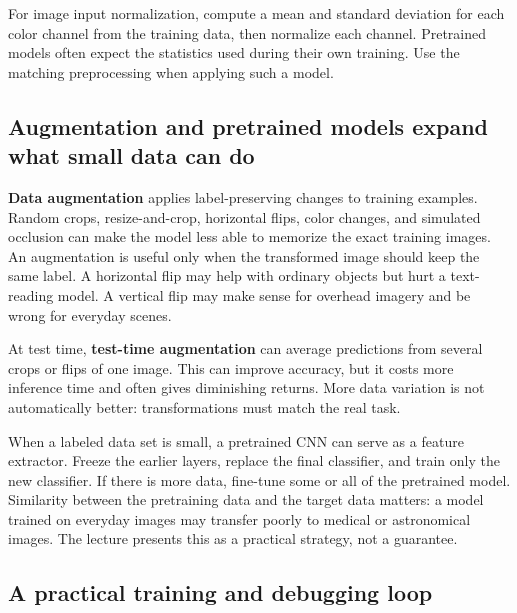 For image input normalization, compute a mean and standard deviation for each color channel from the training data, then normalize each channel. Pretrained models often expect the statistics used during their own training. Use the matching preprocessing when applying such a model.

\subsection{Augmentation and pretrained models expand what small data can do}\label{04-visual-computing-ii-ch031-augmentation-and-pretrained-models-expand-what-small-data-can-do}

\hypertarget{04-visual-computing-ii-ch031-augmentation-and-pretrained-models-expand-what-small-data-can-do}{}

\textbf{Data augmentation} applies label-preserving changes to training examples. Random crops, resize-and-crop, horizontal flips, color changes, and simulated occlusion can make the model less able to memorize the exact training images. An augmentation is useful only when the transformed image should keep the same label. A horizontal flip may help with ordinary objects but hurt a text-reading model. A vertical flip may make sense for overhead imagery and be wrong for everyday scenes.

At test time, \textbf{test-time augmentation} can average predictions from several crops or flips of one image. This can improve accuracy, but it costs more inference time and often gives diminishing returns. More data variation is not automatically better: transformations must match the real task.

When a labeled data set is small, a pretrained CNN can serve as a feature extractor. Freeze the earlier layers, replace the final classifier, and train only the new classifier. If there is more data, fine-tune some or all of the pretrained model. Similarity between the pretraining data and the target data matters: a model trained on everyday images may transfer poorly to medical or astronomical images. The lecture presents this as a practical strategy, not a guarantee.

\subsection{A practical training and debugging loop}\label{04-visual-computing-ii-ch031-a-practical-training-and-debugging-loop}

\hypertarget{04-visual-computing-ii-ch031-a-practical-training-and-debugging-loop}{}

